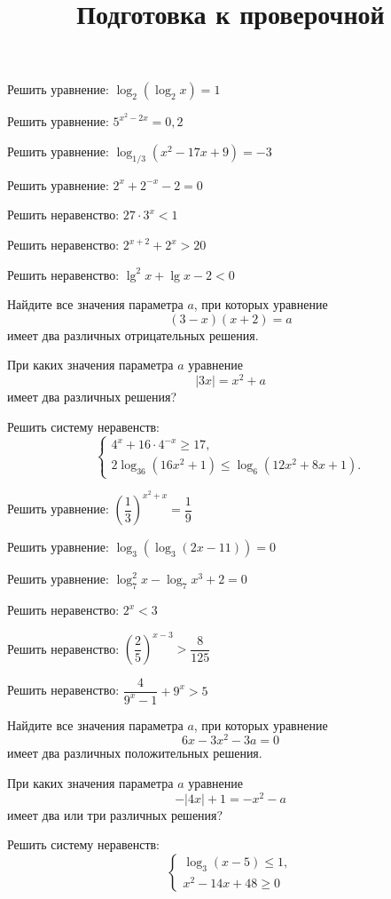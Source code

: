 \begin{class}[number=7]
	\title{Подготовка к проверочной}
	\begin{listofex}
		\item Решить уравнение: \( \log_2(\log_2x)=1 \)
		\item Решить уравнение: \( 5^{x^2-2x}=0,2 \)
		\item Решить уравнение: \( \log_{1/3}(x^2-17x+9)=-3 \)
		\item Решить уравнение: \( 2^x+2^{-x}-2=0 \)
		\item Решить неравенство: \( 27\cdot3^x<1 \)
		\item Решить неравенство: \( 2^{x+2}+2^x>20 \)
		\item Решить неравенство: \( \lg^2x+\lg x - 2 < 0 \)
		\item Найдите все значения параметра \( a \), при которых уравнение
		\[ (3-x)(x+2)=a \]
		имеет два различных отрицательных решения.
		\item При каких значения параметра \( a \) уравнение
		\[ |3x|=x^2+a \]
		имеет два различных решения?
		\item Решить систему неравенств:
		\[ \left\{
		\begin{array}{l}
			4^x+16\cdot4^{-x}\ge17,\\
			2\log_{36}(16x^2+1)\le\log_6(12x^2+8x+1).
		\end{array}
		\right. \]
	\end{listofex}
\end{class}

\begin{exam}
	\begin{listofex}
		\item Решить уравнение: \( \left( \dfrac{1}{3} \right)^{x^2+x}=\dfrac{1}{9} \)
		\item Решить уравнение: \( \log_3(\log_3(2x-11))=0 \)
		\item Решить уравнение: \( \log^2_7x-\log_7x^3+2=0 \)
		\item Решить неравенство: \( 2^x<3 \)
		\item Решить неравенство: \( \left( \dfrac{2}{5} \right)^{x-3}>\dfrac{8}{125} \)
		\item Решить неравенство: \( \dfrac{4}{9^x-1}+9^x>5 \)
		\item Найдите все значения параметра \( a \), при которых уравнение
		\[ 6x-3x^2-3a=0 \]
		имеет два различных положительных решения.
		\item При каких значения параметра \( a \) уравнение
		\[ -|4x|+1=-x^2-a \]
		имеет два или три различных решения?
		\item Решить систему неравенств:
		\[ \left\{
		\begin{array}{l}
			\log_3(x-5)\le1,\\
			x^2-14x+48\ge0
		\end{array}
		\right. \]
	\end{listofex}
\end{exam}

